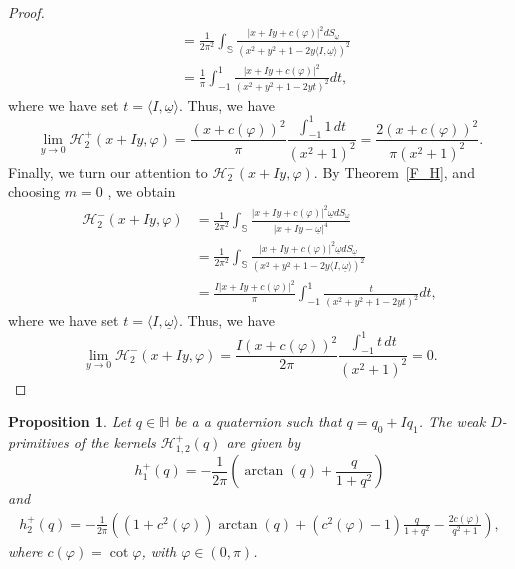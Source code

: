 \documentclass[reqno,11pt]{amsart}
\numberwithin{equation}{section}
\newtheorem{proposition}[theorem]{Proposition}
\theoremstyle{definition}
\begin{document}
\begin{proof}
\begin{align*}
		&=\frac{1}{2 \pi^2} \int_{\mathbb S} \frac{ |x+Iy+c(\varphi)|^2 dS_{\underline{\omega}}}{\left(x^2+y^2+1-2y\langle I,\underline{\omega} \rangle\right)^2}\\
		&= \frac{1}{\pi} \int_{-1}^1 \frac{|x+Iy+c(\varphi)|^2}{\left( x^2+y^2+1-2yt\right)^2} dt,
	\end{align*}
where we have set $t=\langle I,\underline{\omega} \rangle$. Thus, we have
	$$ \lim_{y\to 0}\mathcal H^{+}_2 (x+Iy,\varphi)= \frac{ (x+c(\varphi))^2}{\pi} \frac{\int_{-1}^1 1\, dt}{(x^2+1)^2}=  \frac{2 (x+c(\varphi))^2}{\pi(x^2+1)^2}. $$
Finally, we turn our attention to $\mathcal{H}^-_2(x+Iy,\varphi)$. By Theorem~\ref{F_H}, and choosing $m=0$ , we obtain
	\begin{align*}
		\mathcal H^-_2(x+Iy,\varphi)&= \frac{1}{2 \pi^2}\int_{\mathbb S} \frac{ |x+Iy+c(\varphi)|^2 \underline{\omega} dS_{\underline{\omega}}}{|x+Iy-\underline{\omega}|^4}\\
		&=\frac{1}{2 \pi^2}\int_{\mathbb S} \frac{ |x+Iy+c(\varphi)|^2 \underline{\omega} dS_{\underline{\omega}}}{\left(x^2+y^2+1-2y\langle I,\underline{\omega} \rangle\right)^2}\\
		&= \frac{I |x+Iy+c(\varphi)|^2}{\pi} \int_{-1}^1 \frac{t}{\left( x^2+y^2+1-2yt\right)^2} dt,
	\end{align*}
where we have set $t=\langle I,\underline{\omega} \rangle$.
	Thus, we have
	$$ \lim_{y\to 0}\mathcal H^{-}_2 (x+Iy,\varphi)= \frac{I(x+c(\varphi))^2 }{2 \pi} \frac{\int_{-1}^1  t\, dt}{(x^2+1)^2}=0. $$
\end{proof}
\begin{proposition}\label{restriction_2}
	Let $q\in\mathbb H$ be a a quaternion such that $q=q_0+Iq_1$. The weak $ D$-primitives of the kernels $\mathcal H^{+}_{1,2}(q)$ are given by
$$
		h_{1}^+(q)=-\frac{1}{2 \pi}\left( \arctan(q)+ \frac{q}{1+q^2} \right)
$$
	and
	\begin{align*}
		h_{2}^+(q)=-\frac{1}{2 \pi}\left((1+c^2(\varphi)) \arctan(q)+ (c^2(\varphi)-1)\frac{q}{1+q^2} -\frac{2c(\varphi)}{q^2+1}\right),
	\end{align*}
where $c(\varphi)=\cot \varphi$, with $\varphi \in (0, \pi)$.
\end{proposition}
\end{document}
